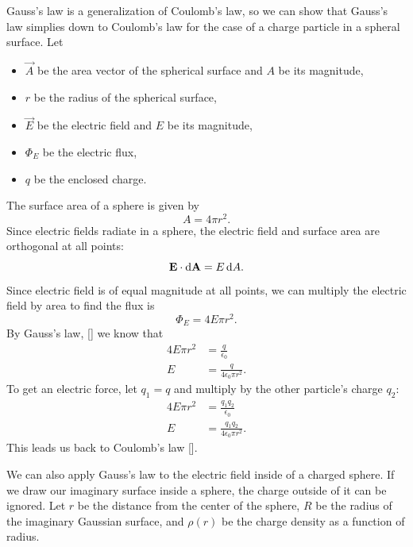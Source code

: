 Gauss's law is a generalization of Coulomb's law,
so we can show that Gauss's law simplies down to Coulomb's law
for the case of a charge particle in a spheral surface.
Let
\begin{itemize}
    \item \(\vec{A}\) be the area vector of the spherical surface
        and \(A\) be its magnitude,
    \item \(r\) be the radius of the spherical surface,
    \item \(\vec{E}\) be the electric field and \(E\) be its magnitude,
    \item \(\Phi_E\) be the electric flux,
    \item \(q\) be the enclosed charge.
\end{itemize}
The surface area of a sphere is given by
\begin{equation}
    A = 4 \pi r^2.
\end{equation}
Since electric fields radiate in a sphere,
the electric field and surface area are orthogonal at all points:
\begin{equation}
    \vec{E} \cdot \odif{\vec{A}} = E \odif{A}.
\end{equation}
Since electric field is of equal magnitude at all points,
we can multiply the electric field by area to find the flux is
\begin{equation}
    \Phi_E = 4 E \pi r^2.
\end{equation}
By Gauss's law, [] we know that
\begin{equation}
    \begin{aligned}
        4 E \pi r^2 &= \frac{q}{\epsilon_0} \\
        E &= \frac{q}{4 \epsilon_0 \pi r^2}.
    \end{aligned}
\end{equation}
To get an electric force,
let \(q_1 = q\) and multiply by the other particle's charge \(q_2\):
\begin{equation*}
    \begin{aligned}
        4 E \pi r^2 &= \frac{q_1 q_2}{\epsilon_0} \\
        E &= \frac{q_1 q_2}{4 \epsilon_0 \pi r^2}.
    \end{aligned}
\end{equation*}
This leads us back to Coulomb's law [].

We can also apply Gauss's law to the electric field inside of a charged sphere.
If we draw our imaginary surface inside a sphere,
the charge outside of it can be ignored.
Let \(r\) be the distance from the center of the sphere,
\(R\) be the radius of the imaginary Gaussian surface,
and \(\rho(r)\) be the charge density as a function of radius.

